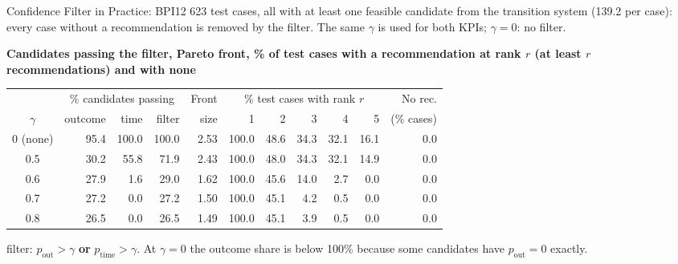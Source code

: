 \documentclass[aspectratio=169]{beamer} %
\begin{document}
\begin{frame}{Confidence Filter in Practice: BPI12}
  \small
  623 test cases, \alert{all} with at least one feasible candidate from the transition system
  (139.2 per case): every case without a recommendation is removed by the filter. The same $\gamma$ is used for
  both KPIs; $\gamma = 0$: no filter.

  \textbf{Candidates passing the filter, Pareto front, \% of test cases with a recommendation at rank $r$ (at least $r$ recommendations) and with none}
  \begin{center}\setlength{\tabcolsep}{4pt}\setlength{\aboverulesep}{0pt}\setlength{\belowrulesep}{1pt}
  \begin{tabular}{crrrrrrrrrr}
    \toprule
     & \multicolumn{3}{c}{\% candidates passing} & Front & \multicolumn{5}{c}{\% test cases with rank $r$} & No rec. \\
    \cmidrule(lr){2-4}\cmidrule(lr){6-10}
    $\gamma$ & outcome & time & filter & size & 1 & 2 & 3 & 4 & 5 & (\% cases) \\
    \midrule
    0 (none) & 95.4  & 100.0 & 100.0 & 2.53 & 100.0 & 48.6 & 34.3 & 32.1 & 16.1 & 0.0 \\
    0.5      & 30.2  & 55.8  & 71.9  & 2.43 & 100.0 & 48.0 & 34.3 & 32.1 & 14.9 & 0.0 \\
    0.6      & 27.9  & 1.6   & 29.0  & 1.62 & 100.0 & 45.6 & 14.0 & 2.7  & 0.0  & 0.0 \\
    0.7      & 27.2  & 0.0   & 27.2  & 1.50 & 100.0 & 45.1 & 4.2  & 0.5  & 0.0  & 0.0 \\
    0.8      & 26.5  & 0.0   & 26.5  & 1.49 & 100.0 & 45.1 & 3.9  & 0.5  & 0.0  & 0.0 \\
    \bottomrule
  \end{tabular}
  \end{center}
  {\scriptsize filter: $p_{\text{out}} > \gamma$ \textbf{or} $p_{\text{time}} > \gamma$. At $\gamma = 0$ the outcome
  share is below 100\% because some candidates have $p_{\text{out}} = 0$ exactly.}
\end{frame}
\end{document}
